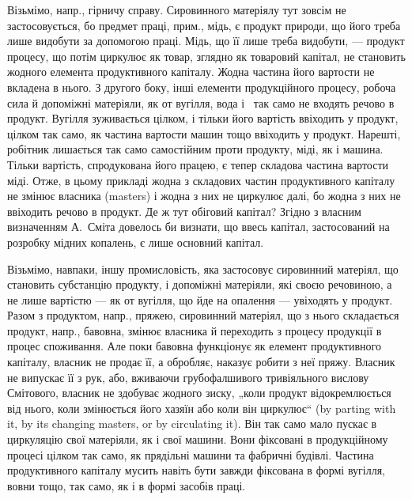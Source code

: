 Візьмімо, напр., гірничу справу. Сировинного матеріялу тут зовсім не
застосовується, бо предмет праці, прим., мідь, є продукт природи, що
його треба лише видобути за допомогою праці. Мідь, що її лише треба
видобути, — продукт процесу, що потім циркулює як товар, зглядно як
товаровий капітал, не становить жодного елемента продуктивного капіталу.
Жодна частина його вартости не вкладена в нього. З другого боку,
інші елементи продукційного процесу, робоча сила й допоміжні матеріяли,
як от вугілля, вода і~ так само не входять речово в продукт.
Вугілля зуживається цілком, і тільки його вартість ввіходить у продукт,
цілком так само, як частина вартости машин тощо ввіходить у продукт.
Нарешті, робітник лишається так само самостійним проти продукту, міді,
як і машина. Тільки вартість, спродукована його працею, є тепер складова
частина вартости міді. Отже, в цьому прикладі жодна з складових
частин продуктивного капіталу не змінює власника (masters) і жодна з
них не циркулює далі, бо жодна з них не ввіходить речово в продукт.
Де ж тут обіговий капітал? Згідно з власним визначенням А.~Сміта довелось
би визнати, що ввесь капітал, застосований на розробку мідних
копалень, є лише основний капітал.

Візьмімо, навпаки, іншу промисловість, яка застосовує сировинний
матеріял, що становить субстанцію продукту, і допоміжні матеріяли, які
своєю речовиною, а не лише вартістю — як от вугілля, що йде на опалення
— увіходять у продукт. Разом з продуктом, напр., пряжею, сировинний
матеріял, що з нього складається продукт, напр., бавовна, змінює
власника й переходить з процесу продукції в процес споживання. Але
поки бавовна функціонує як елемент продуктивного капіталу, власник не
продає її, а обробляє, наказує робити з неї пряжу. Власник не випускає
її з рук, або, вживаючи грубофалшивого тривіяльного вислову Смітового,
власник не здобуває жодного зиску, „коли продукт відокремлюється від
нього, коли змінюється його хазяїн або коли він циркулює“ (by parting
with it, by its changing masters, or by circulating it). Він так само мало
пускає в циркуляцію свої матеріяли, як і свої машини. Вони фіксовані
в продукційному процесі цілком так само, як прядільні машини та фабричні
будівлі. Частина продуктивного капіталу мусить навіть бути завжди
фіксована в формі вугілля, вовни тощо, так само, як і в формі засобів
праці.

